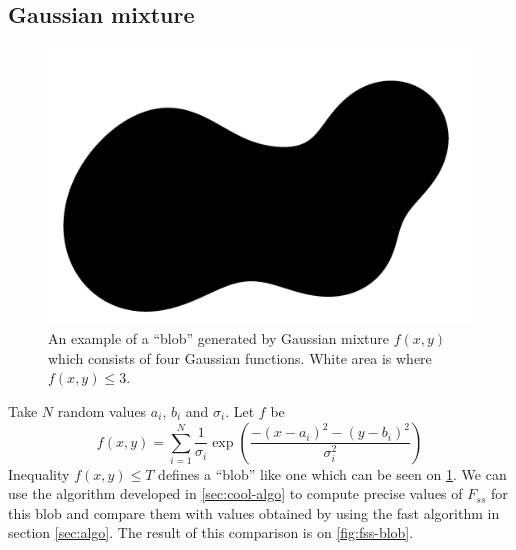 \documentclass[reprint,amsmath,amssymb,aps,pre,showkeys,showpacs]{revtex4-1}
\begin{document}
\subsection{Gaussian mixture}
\label{sec:gauss}
\begin{figure}
  \centering
  \includegraphics[width=0.8\linewidth, frame]{images/blob.png}
  \caption[]{An example of a ``blob'' generated by Gaussian mixture $f(x,y)$
    which consists of four Gaussian functions. White area is where
    $f(x,y) \le 3$.}
  \label{fig:blob}
\end{figure}
Take $N$ random values $a_i$, $b_i$ and $\sigma_i$. Let $f$ be
\begin{equation*}
  f(x,y) = \sum_{i=1}^N \frac{1}{\sigma_i} \exp(\frac{-(x-a_i)^2-(y-b_i)^2}{\sigma_i^2})
\end{equation*}
Inequality $f(x,y) \le T$ defines a ``blob'' like one which can be seen on
\cref{fig:blob}. We can use the algorithm developed in \cref{sec:cool-algo} to
compute precise values of $F_{ss}$ for this blob and compare them with values
obtained by using the fast algorithm in section \cref{sec:algo}. The result of
this comparison is on \cref{fig:fss-blob}.
\end{document}
